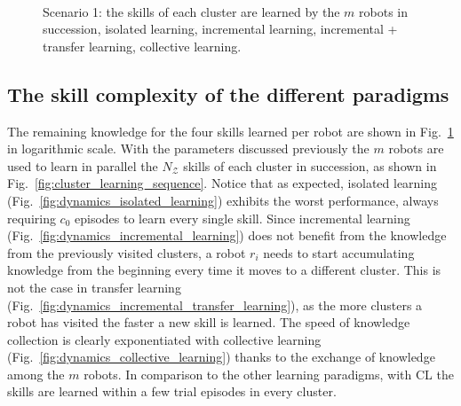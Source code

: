 \begin{figure}[!t]
	\\
	\hspace*{\fill}
	\hspace*{\fill}
	\caption[] {\label{fig:collective_learning} Scenario 1:  the skills of each cluster are learned by the $ m$ robots in succession,  isolated learning,   incremental learning,   incremental + transfer learning,  collective learning.}
\end{figure}

\subsection{The skill complexity of the different paradigms}
The remaining knowledge for the four skills learned per robot are shown in Fig.~\ref{fig:collective_learning} in logarithmic scale. With the parameters discussed previously the $m$ robots are used to learn in parallel the $N_\mathcal{Z}$ skills of each cluster in succession, as shown in Fig.~\ref{fig:cluster_learning_sequence}. Notice that as expected, isolated learning (Fig.~\ref{fig:dynamics_isolated_learning}) exhibits the worst performance, always requiring $c_0$ episodes to learn every single skill. Since incremental learning (Fig.~\ref{fig:dynamics_incremental_learning}) does not benefit from the knowledge from the previously visited clusters, a robot $r_i$ needs to start accumulating knowledge from the beginning every time it moves to a different cluster. This is not the case in transfer learning (Fig.~\ref{fig:dynamics_incremental_transfer_learning}), as the more clusters a robot has visited the faster a new skill is learned. The speed of knowledge collection is clearly exponentiated with collective learning (Fig.~\ref{fig:dynamics_collective_learning}) thanks to the exchange of knowledge among the $m$ robots. In comparison to the other learning paradigms, with CL the skills are learned within a few trial episodes in every cluster. 

